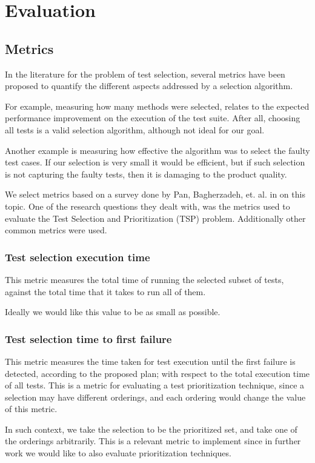 \documentclass{article}
\begin{document}
\section{Evaluation}\label{section:evaluation}
\subsection{Metrics}
In the literature for the problem of test selection, several metrics have been proposed to quantify the different aspects addressed by a selection algorithm.

For example, measuring how many methods were selected, relates to the expected performance improvement on the execution of the test suite. After all, choosing all tests is a valid selection algorithm, although not ideal for our goal.

Another example is measuring how effective the algorithm was to select the faulty test cases. If our selection is very small it would be efficient, but if such selection is not capturing the faulty tests, then it is damaging to the product quality.

We select metrics based on a survey done by Pan, Bagherzadeh, et. al. in \cite{Pan2021TestCS} on this topic. One of the research questions they dealt with, was the metrics used to evaluate the Test Selection and Prioritization (TSP) problem. Additionally other common metrics were used.

\subsubsection{Test selection execution time}
This metric measures the total time of running the selected subset of tests, against the total time that it takes to run all of them.

Ideally we would like this value to be as small as possible.
\subsubsection{Test selection time to first failure}\label{section:tffailure}
This metric measures the time taken for test execution until the first failure is detected, according to the proposed plan; with respect to the total execution time of all tests. This is a metric for evaluating a test prioritization technique, since a selection may have different orderings, and each ordering would change the value of this metric.

In such context, we take the selection to be the prioritized set, and take one of the orderings arbitrarily. This is a relevant metric to implement since in further work we would like to also evaluate prioritization techniques.
\end{document}

